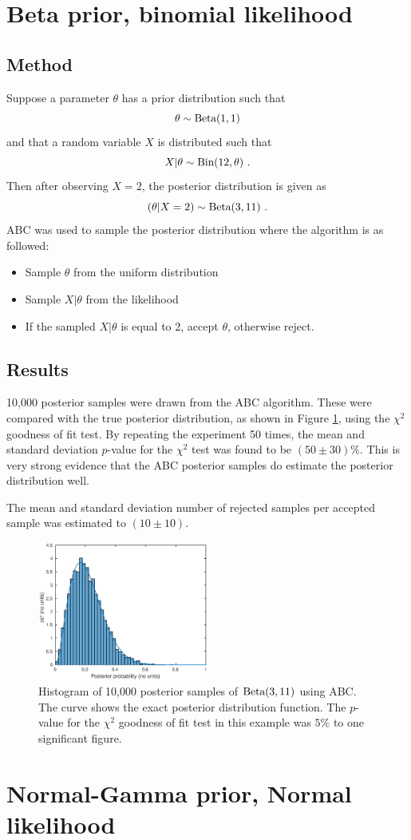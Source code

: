 \documentclass[a4paper]{proc}
\begin{document}
\section{Beta prior, binomial likelihood}
\subsection{Method}
Suppose a parameter $\theta$ has a prior distribution such that
\begin{equation}
\theta\sim\textup{Beta}(1,1)
\end{equation}
and that a random variable $X$ is distributed such that
\begin{equation}
X|\theta\sim\textup{Bin}(12,\theta) \ .
\end{equation}
Then after observing $X=2$, the posterior distribution is given as
\begin{equation}
(\theta|X=2)\sim\textup{Beta}(3,11) \ .
\end{equation}
ABC was used to sample the posterior distribution where the algorithm is as followed:
\begin{itemize}
  \item Sample $\theta$ from the uniform distribution
  \item Sample $X|\theta$ from the likelihood
  \item If the sampled $X|\theta$ is equal to 2, accept $\theta$, otherwise reject.
\end{itemize}

\subsection{Results}
10,000 posterior samples were drawn from the ABC algorithm. These were compared with the true posterior distribution, as shown in Figure \ref{binomial}, using the $\chi^2$ goodness of fit test.  By repeating the experiment 50 times, the mean and standard deviation $p$-value for the $\chi^2$ test was found to be $(50\pm30)\%$. This is very strong evidence that the ABC posterior samples do estimate the posterior distribution well.

The mean and standard deviation number of rejected samples per accepted sample was estimated to $(10\pm10)$.

\begin{figure}
\includegraphics[width=0.5\textwidth]{binomial_ABC0528.eps}
\caption{Histogram of 10,000 posterior samples of $\textup{Beta}(3,11)$ using ABC. The curve shows the exact posterior distribution function. The $p$-value for the $\chi^2$ goodness of fit test in this example was $5\%$ to one significant figure.}
\label{binomial}
\end{figure}

\section{Normal-Gamma prior, Normal likelihood}
\end{document}
